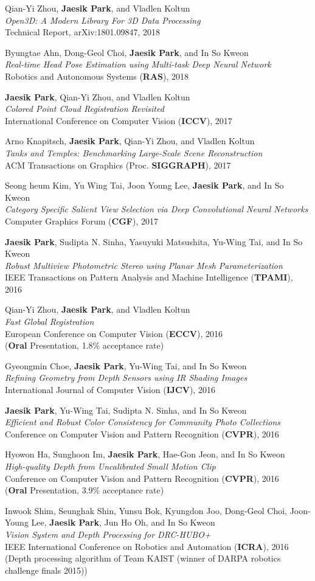 \documentclass[letterpaper,11pt]{article}
\newcommand{\publicationItem}[4]{
  \small{
  \item{#1\\ \emph{#2}\\ #3\\ #4}
  }
}
\begin{document}
    \publicationItem{Qian-Yi Zhou, \textbf{Jaesik Park}, and Vladlen Koltun}{Open3D: A Modern Library For 3D Data Processing}{Technical Report, arXiv:1801.09847, 2018}{}
    \publicationItem{Byungtae Ahn, Dong-Geol Choi, \textbf{Jaesik Park}, and In So Kweon}{Real-time Head Pose Estimation using Multi-task Deep Neural Network}{Robotics and Autonomous Systems (\textbf{RAS}), 2018}{}
    \publicationItem{\textbf{Jaesik Park}, Qian-Yi Zhou, and Vladlen Koltun}{Colored Point Cloud Registration Revisited}{International Conference on Computer Vision (\textbf{ICCV}), 2017}{}
    \publicationItem{Arno Knapitsch, \textbf{Jaesik Park}, Qian-Yi Zhou, and Vladlen Koltun}{Tanks and Temples: Benchmarking Large-Scale Scene Reconstruction}{ACM Transactions on Graphics (Proc. \textbf{SIGGRAPH}), 2017}{}
    \publicationItem{Seong heum Kim, Yu Wing Tai, Joon Young Lee, \textbf{Jaesik Park}, and In So Kweon}{Category Specific Salient View Selection via Deep Convolutional Neural Networks}{Computer Graphics Forum (\textbf{CGF}), 2017}{}
    \publicationItem{\textbf{Jaesik Park}, Sudipta N. Sinha, Yasuyuki Matsushita, Yu-Wing Tai, and In So Kweon}{Robust Multiview Photometric Stereo using Planar Mesh Parameterization}{IEEE Transactions on Pattern Analysis and Machine Intelligence (\textbf{TPAMI}), 2016}{}
    \publicationItem{Qian-Yi Zhou, \textbf{Jaesik Park}, and Vladlen Koltun}{Fast Global Registration}{European Conference on Computer Vision (\textbf{ECCV}), 2016}{(\textbf{Oral} Presentation, 1.8\% acceptance rate)}
    \publicationItem{Gyeongmin Choe, \textbf{Jaesik Park}, Yu-Wing Tai, and In So Kweon}{Refining Geometry from Depth Sensors using IR Shading Images}{International Journal of Computer Vision (\textbf{IJCV}), 2016}{}
    \publicationItem{\textbf{Jaesik Park}, Yu-Wing Tai, Sudipta N. Sinha, and In So Kweon}{Efficient and Robust Color Consistency for Community Photo Collections}{Conference on Computer Vision and Pattern Recognition (\textbf{CVPR}), 2016}{}
    \publicationItem{Hyowon Ha, Sunghoon Im, \textbf{Jaesik Park}, Hae-Gon Jeon, and In So Kweon}{High-quality Depth from Uncalibrated Small Motion Clip}{Conference on Computer Vision and Pattern Recognition (\textbf{CVPR}), 2016}{(\textbf{Oral} Presentation, 3.9\% acceptance rate)}
    \publicationItem{Inwook Shim, Seunghak Shin, Yunsu Bok, Kyungdon Joo, Dong-Geol Choi, Joon-Young Lee, \textbf{Jaesik Park}, Jun Ho Oh, and In So Kweon}{Vision System and Depth Processing for DRC-HUBO+}{IEEE International Conference on Robotics and Automation (\textbf{ICRA}), 2016}{(Depth processing algorithm of Team KAIST (winner of DARPA robotics challenge finals 2015))}
\end{document}
